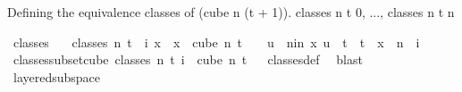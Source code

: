 \begin{isabellebody}
%
\isadelimdocument
%
\endisadelimdocument
%
\begin{isamarkuptext}%
Defining the equivalence classes of (cube n (t + 1)). {classes n t 0, ..., classes n t n}%
\end{isamarkuptext}\isamarkuptrue%
\isamarkupfalse%
\ classes\isanewline
\ \ \ {\isachardoublequoteopen}classes\ n\ t\ {\isasymequiv}\ {\isacharparenleft}{\kern0pt}{\isasymlambda}i{\isachardot}{\kern0pt}\ {\isacharbraceleft}{\kern0pt}x\ {\isachardot}{\kern0pt}\ x\ {\isasymin}\ {\isacharparenleft}{\kern0pt}cube\ n\ {\isacharparenleft}{\kern0pt}t\ {\isacharplus}{\kern0pt}\ {}{\isacharparenright}{\kern0pt}{\isacharparenright}{\kern0pt}\ {\isasymand}\ {\isacharparenleft}{\kern0pt}{\isasymforall}u\ {\isasymin}\ {\isacharbraceleft}{\kern0pt}{\isacharparenleft}{\kern0pt}n{\isacharminus}{\kern0pt}i{\isacharparenright}{\kern0pt}{\isachardot}{\kern0pt}{\isachardot}{\kern0pt}{\isacharless}{\kern0pt}n{\isacharbraceright}{\kern0pt}{\isachardot}{\kern0pt}\ x\ u\ {\isacharequal}{\kern0pt}\ t{\isacharparenright}{\kern0pt}\ {\isasymand}\ t\ {\isasymnotin}\ x\ {\isacharbackquote}{\kern0pt}\ {\isacharbraceleft}{\kern0pt}{\isachardot}{\kern0pt}{\isachardot}{\kern0pt}{\isacharless}{\kern0pt}{\isacharparenleft}{\kern0pt}n\ {\isacharminus}{\kern0pt}\ i{\isacharparenright}{\kern0pt}{\isacharbraceright}{\kern0pt}{\isacharbraceright}{\kern0pt}{\isacharparenright}{\kern0pt}{\isachardoublequoteclose}\isanewline
\isanewline
{}\isamarkupfalse%
\ classes{\isacharunderscore}{\kern0pt}subset{\isacharunderscore}{\kern0pt}cube{\isacharcolon}{\kern0pt}\ {\isachardoublequoteopen}classes\ n\ t\ i\ {\isasymsubseteq}\ cube\ n\ {\isacharparenleft}{\kern0pt}t{\isacharplus}{\kern0pt}{}{\isacharparenright}{\kern0pt}{\isachardoublequoteclose}%
\isadelimproof
\ %
\endisadelimproof
%
\isatagproof
{}\isamarkupfalse%
\ classes{\isacharunderscore}{\kern0pt}def\ \isamarkupfalse%
\ blast%
\endisatagproof
{\isafoldproof}%
%
\isadelimproof
%
\endisadelimproof
\isanewline
\isanewline
{}\isamarkupfalse%
\ layered{\isacharunderscore}{\kern0pt}subspace\isanewline

\end{isabellebody}

